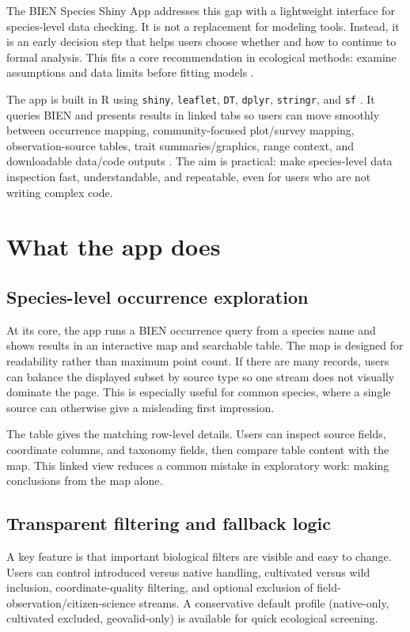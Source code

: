 \documentclass[11pt]{article}
\begin{document}
The BIEN Species Shiny App addresses this gap with a lightweight interface for species-level data checking. It is not a replacement for modeling tools. Instead, it is an early decision step that helps users choose whether and how to continue to formal analysis. This fits a core recommendation in ecological methods: examine assumptions and data limits before fitting models \citep{Merow2013MaxEntGuide, Merow2014Maxlike, Merow2016ExpertMaps}.

The app is built in R using \texttt{shiny}, \texttt{leaflet}, \texttt{DT}, \texttt{dplyr}, \texttt{stringr}, and \texttt{sf} \citep{Chang2024Shiny, Cheng2024Leaflet, Xie2024DT, Wickham2023Dplyr, Wickham2023Stringr, Pebesma2018SF}. It queries BIEN and presents results in linked tabs so users can move smoothly between occurrence mapping, community-focused plot/survey mapping, observation-source tables, trait summaries/graphics, range context, and downloadable data/code outputs \citep{Maitner2025BIEN}. The aim is practical: make species-level data inspection fast, understandable, and repeatable, even for users who are not writing complex code.

\section*{What the app does}
\subsection*{Species-level occurrence exploration}
At its core, the app runs a BIEN occurrence query from a species name and shows results in an interactive map and searchable table. The map is designed for readability rather than maximum point count. If there are many records, users can balance the displayed subset by source type so one stream does not visually dominate the page. This is especially useful for common species, where a single source can otherwise give a misleading first impression.

The table gives the matching row-level details. Users can inspect source fields, coordinate columns, and taxonomy fields, then compare table content with the map. This linked view reduces a common mistake in exploratory work: making conclusions from the map alone.

\subsection*{Transparent filtering and fallback logic}
A key feature is that important biological filters are visible and easy to change. Users can control introduced versus native handling, cultivated versus wild inclusion, coordinate-quality filtering, and optional exclusion of field-observation/citizen-science streams. A conservative default profile (native-only, cultivated excluded, geovalid-only) is available for quick ecological screening.
\end{document}
